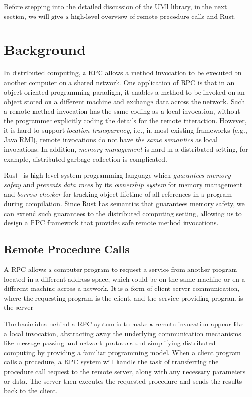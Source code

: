 Before stepping into the detailed discussion of the UMI library, in the next section, we will give a high-level overview of remote procedure calls and Rust.

\section{Background}
\label{chap3:background}
In distributed computing, a RPC allows a method invocation to be executed on another computer on a shared network. One application of RPC is that in an object-oriented programming paradigm, it enables a method to be invoked on an object stored on a different machine and exchange data across the network. Such a remote method invocation has the same coding as a local invocation, without the programmer explicitly coding the details for the remote interaction.
However, it is hard to support \emph{location transparency}, i.e., in most existing frameworks (e.g., Java RMI), remote invocations do not have \emph{the same semantics} as local invocations. In addition, \emph{memory management} is hard in a distributed setting, for example, distributed garbage collection is complicated.

Rust~\citep{10.5555/3271463} is high-level system programming language which \emph{guarantees memory safety} and \emph{prevents data races} by its \emph{ownership system} for memory management and \emph{borrow checker} for tracking object lifetime of all references in a program during compilation.
Since Rust has semantics that guarantees memory safety, we can extend such guarantees to the distributed computing setting, allowing us to design a RPC framework that provides safe remote method invocations.

\subsection{Remote Procedure Calls}
\label{chap3:background:rpc}
A RPC allows a computer program to request a service from another program located in a different address space, which could be on the same machine or on a different machine across a network. It is a form of client-server communication, where the requesting program is the client, and the service-providing program is the server.

The basic idea behind a RPC system is to make a remote invocation appear like a local invocation, abstracting away the underlying communication mechanisms like message passing and network protocols and simplifying distributed computing by providing a familiar programming model. When a client program calls a procedure, a RPC system will handle the task of transferring the procedure call request to the remote server, along with any necessary parameters or data. The server then executes the requested procedure and sends the results back to the client.

